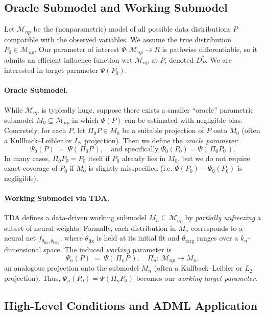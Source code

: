 \documentclass{article}
\theoremstyle{remark}
\begin{document}
\subsection{Oracle Submodel and Working Submodel}

Let $\mathcal{M}_{np}$ be the (nonparametric) model of all possible data distributions $P$ compatible with the observed variables.  We assume the true distribution $P_0\in \mathcal{M}_{np}$.  Our parameter of interest $\Psi:\mathcal{M}_{np} \to R $ is pathwise differentiable, so it admits an efficient influence function wrt $\mathcal{M}_{np}$ at $P$, denoted $D^*_{P}$. We are interested in target parameter $\Psi(P_0)$.

\paragraph{Oracle Submodel.}
While $\mathcal{M}_{np}$ is typically huge, suppose there exists a smaller ``oracle'' parametric submodel $M_0\subseteq \mathcal{M}_{np}$ in which $\Psi(P)$ can be estimated with negligible bias.  Concretely, for each $P$, let $\Pi_0P \in M_0$ be a suitable projection of $P$ onto $M_0$ (often a Kullback–Leibler or $L_2$ projection). Then we define the \emph{oracle parameter}:
\[
  \Psi_0(P) \;=\; \Psi(\,\Pi_0P\,),
  \quad
  \text{and specifically } 
  \Psi_0(P_0) = \Psi(\,\Pi_0P_0\,).
\]
In many cases, $\Pi_0P_0 = P_0$ itself if $P_0$ already lies in $M_0$, but we do not require exact coverage of $P_0$ if $M_0$ is slightly misspecified (i.e. $\Psi(P_0)-\Psi_0(P_0)$ is negligible).

\paragraph{Working Submodel via TDA.}
TDA defines a data-driven working submodel $M_n\subseteq \mathcal{M}_{np}$ by \emph{partially unfreezing} a subset of neural weights.  Formally, each distribution in $M_n$ corresponds to a neural net $f_{\theta_{\text{fix}}, \theta_{\text{targ}}}$, where $\theta_{\text{fix}}$ is held at its initial fit and $\theta_{\text{targ}}$ ranges over a $k_n$-dimensional space.  The induced \emph{working} parameter is
\[
  \Psi_n(P)
  \;=\;
  \Psi(\,\Pi_nP\,),
  \quad
  \Pi_n:\,\mathcal{M}_{np}\to M_n,
\]
an analogous projection onto the submodel $M_n$ (often a Kullback–Leibler or $L_2$ projection).  Thus, $\Psi_n(P_0)=\Psi(\Pi_nP_0)$ becomes our \emph{working target parameter}.

\subsection{High-Level Conditions and ADML Application}\label{sec:theory:assump}
\end{document}
